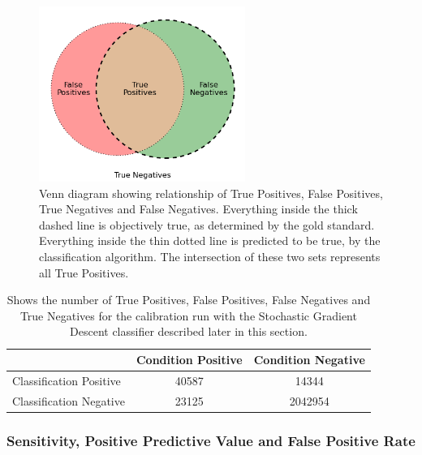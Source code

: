 \documentclass[pdftex,12pt,a4paper]{report}
\begin{document}
\begin{figure}[hb!]
    \centering
    \includegraphics[width=0.6\textwidth]{figures/tf_np_venn_cropped}
    \vspace{-10pt}
    \caption{Venn diagram showing relationship of True Positives, False Positives, True Negatives and
        False Negatives. Everything inside the thick dashed line is objectively true, as determined
        by the gold standard. Everything inside the thin dotted line is predicted to be true, by the
        classification algorithm. The intersection of these two sets represents all True Positives.}
    \label{fig:tf_np_venn}
    \vspace{-10pt}
\end{figure}

\begin{table}[hb!]
    \centering
    \begin{tabular}{ l | c c }
                                & Condition Positive & Condition Negative \\
        \hline
        Classification Positive & \SI{40587}{} & \SI{14344}{} \\
        Classification Negative & \SI{23125}{} & \SI{2042954}{} \\
    \end{tabular}
    \caption{Shows the number of True Positives, False Positives, False Negatives and True Negatives
        for the calibration run with the Stochastic Gradient Descent classifier described later in this
        section. }
    \label{tab:tf_np_table}
\end{table}

\newpage
\subsubsection{Sensitivity, Positive Predictive Value and False Positive Rate}
\end{document}
